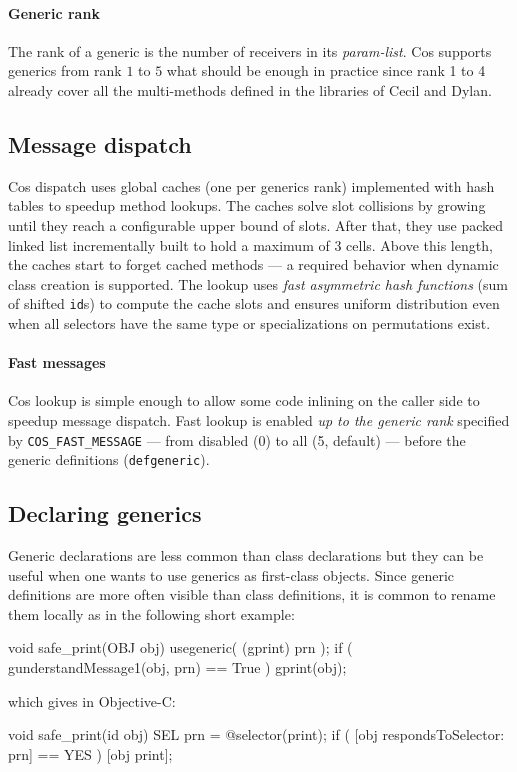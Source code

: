 \documentclass[preprint,10pt]{sigplanconf}
\newcommand{\ProgLang}[1]{{\sc #1}\xspace}
\newcommand{\Cecil}     {\ProgLang{Cecil}}
\newcommand{\Cos}       {\ProgLang{Cos}}
\newcommand{\Dylan}     {\ProgLang{Dylan}}
\newcommand{\Objc}      {\ProgLang{Objective-C}}
\newcommand{\code}[1]{\lstinline[language=COS,style=samplecode]|#1|}
\begin{document}
\paragraph{Generic rank}

The rank of a generic is the number of receivers in its {\em param-list}. \Cos supports generics from rank $1$ to $5$ what should be enough in practice since rank 1 to 4 already cover all the multi-methods defined in the libraries of \Cecil and \Dylan \cite{duj98,zib02,cecil04}.

\subsection{Message dispatch}

\Cos dispatch uses global caches (one per generics rank) implemented with hash tables to speedup method lookups. The caches solve slot collisions by growing until they reach a configurable upper bound of slots. After that, they use packed linked list incrementally built to hold a maximum of $3$ cells. Above this length, the caches start to forget cached methods --- a required behavior when dynamic class creation is supported. The lookup uses {\em fast asymmetric hash functions} (sum of shifted \code{id}s) to compute the cache slots and ensures uniform distribution even when all selectors have the same type or specializations on permutations exist.







\paragraph{Fast messages}

\Cos lookup is simple enough to allow some code inlining on the caller side to speedup message dispatch. Fast lookup is enabled {\em up to the generic rank} specified by \code{COS_FAST_MESSAGE} --- from disabled (0) to all (5, default) --- before the generic definitions (\code{defgeneric}).

\subsection{Declaring generics}

Generic declarations are less common than class declarations but they can be useful when one wants to use generics as first-class objects. Since generic definitions are more often visible than class definitions, it is common to rename them locally as in the following short example:
\begin{COS}
void safe_print(OBJ obj) {
  usegeneric( (gprint) prn );
  if ( gunderstandMessage1(obj, prn) == True )
    gprint(obj);
}
\end{COS}
which gives in \Objc:
\begin{OBJC}
void safe_print(id obj) {
  SEL prn = @selector(print);
  if ( [obj respondsToSelector: prn] == YES )
    [obj print];
}
\end{OBJC}
\end{document}
